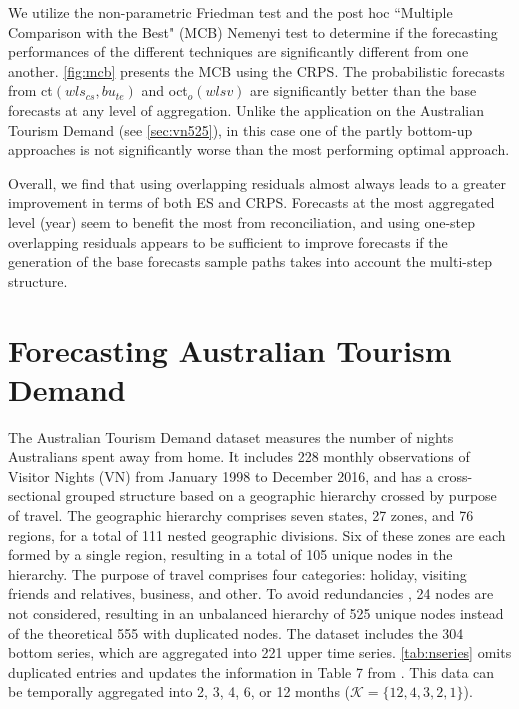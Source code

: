 \documentclass[a4paper,11pt]{article}
\theoremstyle{definition}
\begin{document}
We utilize the non-parametric Friedman test and the post hoc “Multiple Comparison with the Best" (MCB) Nemenyi test \citep{koning2005, kourentzes2019, makridakis2022, tsutils} to determine if the forecasting performances of the different techniques are significantly different from one another.
\autoref{fig:mcb} presents the MCB using the CRPS. The probabilistic forecasts from ct$(wls_{cs},bu_{te})$ and oct$_o(wlsv)$ are significantly better than the base forecasts at any level of aggregation. Unlike the application on the Australian Tourism Demand (see \autoref{sec:vn525}), in this case one of the partly bottom-up approaches is not significantly worse than the most performing optimal approach.

Overall, we find that using overlapping residuals almost always leads to a greater improvement in terms of both ES and CRPS. %
Forecasts at the most aggregated level (year) seem to benefit the most from reconciliation, and using one-step overlapping residuals appears to be sufficient to improve forecasts if the generation of the base forecasts sample paths takes into account the multi-step structure.



\section{Forecasting Australian Tourism Demand}\label{sec:vn525}

The Australian Tourism Demand dataset \citep{wickramasuriya2019} measures the number of nights Australians spent away from home. It includes 228 monthly observations of Visitor Nights (VN) from January 1998 to December 2016, and has a cross-sectional grouped structure based on a geographic hierarchy crossed by purpose of travel. The geographic hierarchy comprises seven states, 27 zones, and 76 regions, for a total of 111 nested geographic divisions. Six of these zones are each formed by a single region, resulting in a total of 105 unique nodes in the hierarchy. The purpose of travel comprises four categories: holiday, visiting friends and relatives, business, and other.
To avoid redundancies \citep{difonzo2022a}, 24 nodes are not considered, resulting in an unbalanced hierarchy of 525 unique nodes instead of the theoretical 555 with duplicated nodes.
The dataset includes the 304 bottom series, which are aggregated into 221 upper time series. \autoref{tab:nseries} omits duplicated entries and updates the information in Table 7 from \cite{wickramasuriya2019}. This data can be temporally aggregated into 2, 3, 4, 6, or 12 months ($\mathcal{K} = \{12,4,3,2,1\}$).
\end{document}
